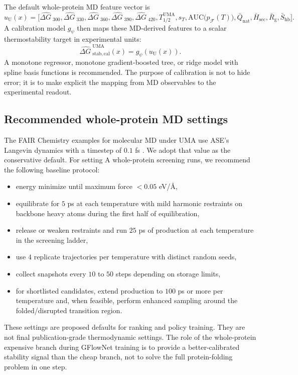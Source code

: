 \documentclass[11pt]{article}
\newcommand{\angstrom}{\ensuremath{\text{\AA}}}
\newcommand{\dG}{\ensuremath{\Delta G \ }}
\begin{document}
The default whole-protein MD feature vector is
\begin{equation}
\label{eq:umafeatures_dup}
    u_{\mathrm U}(x)=\Big[\widehat{\dG}_{300},\widehat{\dG}_{330},\widehat{\dG}_{360},\widehat{\dG}_{390},\widehat{\dG}_{420},T_{1/2}^{\mathrm{UMA}},s_T,\mathrm{AUC}\big(p_{\mathcal F}(T)\big),\bar Q_{\mathrm{nat}},\bar H_{\mathrm{sec}},\bar R_{\mathrm g},\bar S_{\mathrm{hb}}\Big].
\end{equation}
A calibration model $g_\psi$ then maps these MD-derived features to a scalar thermostability target in experimental units:
\begin{equation}
    \widehat{\dG}^{\mathrm{UMA}}_{\mathrm{stab,cal}}(x)=g_\psi\!\left(u_{\mathrm U}(x)\right).
\end{equation}
A monotone regressor, monotone gradient-boosted tree, or ridge model with spline basis functions is recommended. The purpose of calibration is not to hide error; it is to make explicit the mapping from MD observables to the experimental readout.

\subsection{Recommended whole-protein MD settings}

The FAIR Chemistry examples for molecular MD under UMA use ASE's Langevin dynamics with a timestep of $0.1$ fs \citep{fairchem2025github}. We adopt that value as the conservative default. For setting A whole-protein screening runs, we recommend the following baseline protocol:
\begin{itemize}[leftmargin=1.5em]
    \item energy minimize until maximum force $<0.05$ eV/\angstrom,
    \item equilibrate for $5$ ps at each temperature with mild harmonic restraints on backbone heavy atoms during the first half of equilibration,
    \item release or weaken restraints and run $25$ ps of production at each temperature in the screening ladder,
    \item use $4$ replicate trajectories per temperature with distinct random seeds,
    \item collect snapshots every $10$ to $50$ steps depending on storage limits,
    \item for shortlisted candidates, extend production to $100$ ps or more per temperature and, when feasible, perform enhanced sampling around the folded/disrupted transition region.
\end{itemize}
These settings are proposed defaults for ranking and policy training. They are not final publication-grade thermodynamic settings. The role of the whole-protein expensive branch during GFlowNet training is to provide a better-calibrated stability signal than the cheap branch, not to solve the full protein-folding problem in one step.
\end{document}
